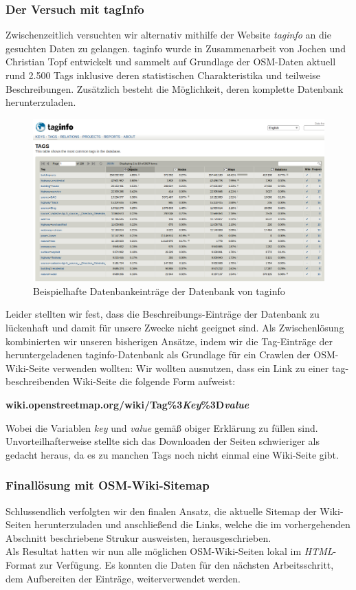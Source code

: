 \documentclass[12pt,pdftex,a4paper]{article}
\begin{document}
\subsubsection{Der Versuch mit tagInfo}
Zwischenzeitlich versuchten wir alternativ mithilfe der Website \textit{taginfo} \cite{taginfoWebsite} an die gesuchten Daten zu gelangen. taginfo wurde in Zusammenarbeit von Jochen und Christian Topf entwickelt und sammelt auf Grundlage der OSM-Daten aktuell rund 2.500 Tags inklusive deren statistischen Charakteristika und teilweise Beschreibungen\cite{taginfoAbout}. Zusätzlich besteht die Möglichkeit, deren komplette Datenbank herunterzuladen.\\
\begin{figure}[h]
	\centering
	\includegraphics[width=0.9\linewidth]{Bilder/taginfo_example}
	\caption[Beispielhafte Darstellung taginfo]{Beispielhafte Datenbankeinträge der Datenbank von taginfo}
	\label{fig:taginfoexample}
\end{figure}
Leider stellten wir fest, dass die Beschreibungs-Einträge der Datenbank zu lückenhaft und damit für unsere Zwecke nicht geeignet sind.
Als Zwischenlösung kombinierten wir unseren bisherigen Ansätze, indem wir die Tag-Einträge der heruntergeladenen taginfo-Datenbank als Grundlage für ein Crawlen der OSM-Wiki-Seite verwenden wollten: Wir wollten ausnutzen, dass ein Link zu einer tag-beschreibenden Wiki-Seite die folgende Form aufweist:
\begin{center}
	\textbf{wiki.openstreetmap.org/wiki/Tag\%3\textit{Key}\%3D\textit{value}}
\end{center}
Wobei die Variablen \textit{key} und \textit{value} gemäß obiger Erklärung zu füllen sind. Unvorteilhafterweise stellte sich das Downloaden der Seiten schwieriger als gedacht heraus, da es zu manchen Tags noch nicht einmal eine Wiki-Seite gibt.

\subsubsection{Finallösung mit OSM-Wiki-Sitemap}
Schlussendlich verfolgten wir den finalen Ansatz, die aktuelle Sitemap der Wiki-Seiten\cite{sitemap-index-wiki-link} herunterzuladen und anschließend die Links, welche die im vorhergehenden Abschnitt beschriebene Strukur ausweisten, herausgeschrieben.\\
Als Resultat hatten wir nun alle möglichen OSM-Wiki-Seiten lokal im \textit{HTML}-Format zur Verfügung. Es konnten die Daten für den nächsten Arbeitsschritt, dem Aufbereiten der Einträge, weiterverwendet werden.
\end{document}
